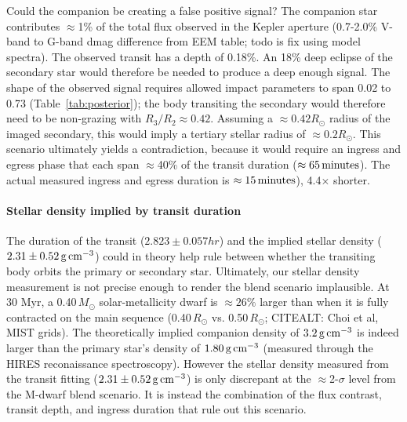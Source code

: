 \documentclass[12pt,modern,twocolumn,tighten]{aastex63}
\begin{document}
Could the companion be creating a false positive signal?  The
companion star contributes $\approx$1\% of the total flux observed in
the Kepler aperture (0.7-2.0\% V-band to G-band dmag difference from
EEM table; todo is fix using model spectra).  The observed transit has
a depth of 0.18\%.  An 18\% deep eclipse of the secondary star would
therefore be needed to produce a deep enough signal.  The shape of the
observed signal requires allowed impact parameters to span 0.02 to
0.73 (Table~\ref{tab:posterior}); the body transiting the secondary
would therefore need to be non-grazing with $R_3/R_2 \approx 0.42$.
Assuming a $\approx 0.42R_\odot$ radius of the imaged secondary, this
would imply a tertiary stellar radius of $\approx 0.2R_\odot$.  This
scenario ultimately yields a contradiction, because it would require
an ingress and egress phase that each span $\approx$40\% of the
transit duration ($\approx 65\,{\rm minutes}$).  The actual measured
ingress and egress duration is $\approx 15\,{\rm minutes}$),
4.4$\times$ shorter.

\paragraph{Stellar density implied by transit duration}
The duration of the transit ($2.823 \pm 0.057 hr$) and the implied
stellar density ($2.31 \pm 0.52\,{\rm g\,cm}^{-3}$) could in theory
help rule between whether the transiting body orbits the primary or
secondary star.  Ultimately, our stellar density measurement is not
precise enough to render the blend scenario implausible.  At 30 Myr, a
0.40\,$M_\odot$ solar-metallicity dwarf is $\approx 26\%$ larger than
when it is fully contracted on the main sequence (0.40\,$R_\odot$
vs{.} 0.50\,$R_\odot$; CITEALT: Choi et al, MIST grids).  The
theoretically implied companion density of $3.2\,{\rm g\,cm}^{-3}$ is
indeed larger than the primary star's density of $1.80\,{\rm
g\,cm}^{-3}$ (measured through the HIRES reconaissance spectroscopy).
However the stellar density measured from the transit fitting ($2.31
\pm 0.52\,{\rm g\,cm}^{-3}$) is only discrepant at the
$\approx$2-$\sigma$ level from the M-dwarf blend scenario.  It is
instead the combination of the flux contrast, transit depth, and
ingress duration that rule out this scenario.









% 


\listofchanges

\end{document}
